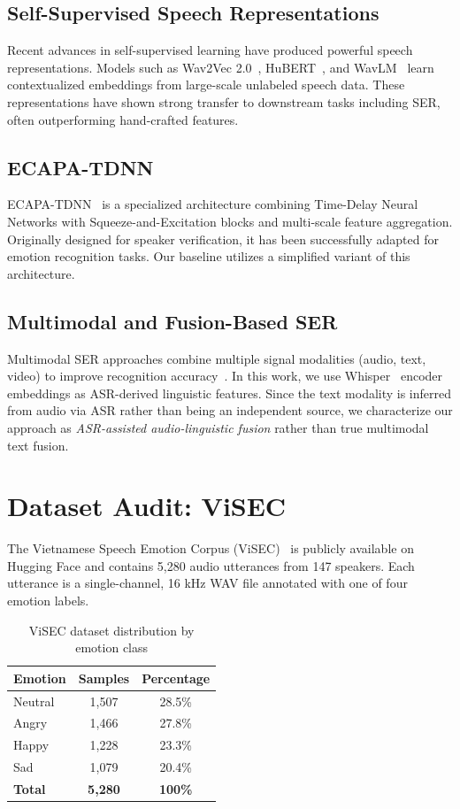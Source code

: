 \documentclass[12pt,a4paper]{report}
\begin{document}
\section{Self-Supervised Speech Representations}
Recent advances in self-supervised learning have produced powerful speech representations. Models such as Wav2Vec 2.0~\cite{wav2vec2}, HuBERT~\cite{hubert}, and WavLM~\cite{wavlm} learn contextualized embeddings from large-scale unlabeled speech data. These representations have shown strong transfer to downstream tasks including SER, often outperforming hand-crafted features.

\section{ECAPA-TDNN}
ECAPA-TDNN~\cite{ecapa} is a specialized architecture combining Time-Delay Neural Networks with Squeeze-and-Excitation blocks and multi-scale feature aggregation. Originally designed for speaker verification, it has been successfully adapted for emotion recognition tasks. Our baseline utilizes a simplified variant of this architecture.

\section{Multimodal and Fusion-Based SER}
Multimodal SER approaches combine multiple signal modalities (audio, text, video) to improve recognition accuracy~\cite{ser_multimodal}. In this work, we use Whisper~\cite{whisper} encoder embeddings as ASR-derived linguistic features. Since the text modality is inferred from audio via ASR rather than being an independent source, we characterize our approach as \emph{ASR-assisted audio-linguistic fusion} rather than true multimodal text fusion.

\chapter{Dataset Audit: ViSEC}

The Vietnamese Speech Emotion Corpus (ViSEC)~\cite{visec} is publicly available on Hugging Face and contains 5,280 audio utterances from 147 speakers. Each utterance is a single-channel, 16 kHz WAV file annotated with one of four emotion labels.

\begin{table}[h]
\centering
\begin{tabular}{lcc}
\hline
\textbf{Emotion} & \textbf{Samples} & \textbf{Percentage} \\
\hline
Neutral & 1,507 & 28.5\% \\
Angry   & 1,466 & 27.8\% \\
Happy   & 1,228 & 23.3\% \\
Sad     & 1,079 & 20.4\% \\
\hline
\textbf{Total} & \textbf{5,280} & \textbf{100\%} \\
\hline
\end{tabular}
\caption{ViSEC dataset distribution by emotion class}
\label{tab:dataset_dist}
\end{table}
\end{document}
